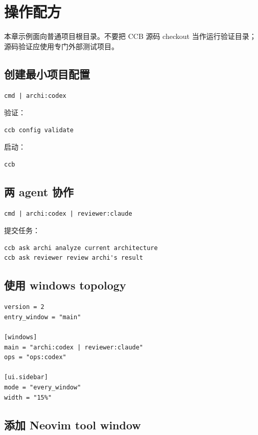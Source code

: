 \chapter{操作配方}

本章示例面向普通项目根目录。不要把 CCB 源码 checkout  当作运行验证目录；源码验证应使用专门外部测试项目。

\section{创建最小项目配置}

\begin{lstlisting}
cmd | archi:codex
\end{lstlisting}

验证：

\begin{lstlisting}
ccb config validate
\end{lstlisting}

启动：

\begin{lstlisting}
ccb
\end{lstlisting}

\section{两 agent 协作}

\begin{lstlisting}
cmd | archi:codex | reviewer:claude
\end{lstlisting}

提交任务：

\begin{lstlisting}
ccb ask archi analyze current architecture
ccb ask reviewer review archi's result
\end{lstlisting}

\section{使用 windows topology}

\begin{lstlisting}
version = 2
entry_window = "main"

[windows]
main = "archi:codex | reviewer:claude"
ops = "ops:codex"

[ui.sidebar]
mode = "every_window"
width = "15%"
\end{lstlisting}

\section{添加 Neovim tool window}


